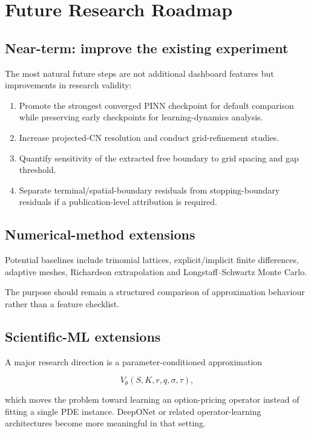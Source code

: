 \documentclass[11pt,a4paper]{article}
\begin{document}
\section{Future Research Roadmap}

\subsection{Near-term: improve the existing experiment}

The most natural future steps are not additional dashboard features but improvements in research validity:

\begin{enumerate}[leftmargin=2em]
\item Promote the strongest converged PINN checkpoint for default comparison while preserving early checkpoints for learning-dynamics analysis.
\item Increase projected-CN resolution and conduct grid-refinement studies.
\item Quantify sensitivity of the extracted free boundary to grid spacing and gap threshold.
\item Separate terminal/spatial-boundary residuals from stopping-boundary residuals if a publication-level attribution is required.
\end{enumerate}

\subsection{Numerical-method extensions}

Potential baselines include trinomial lattices, explicit/implicit finite differences, adaptive meshes, Richardson extrapolation and Longstaff--Schwartz Monte Carlo.

The purpose should remain a structured comparison of approximation behaviour rather than a feature checklist.

\subsection{Scientific-ML extensions}

A major research direction is a parameter-conditioned approximation

\[
V_\theta(S,K,r,q,\sigma,\tau),
\]

which moves the problem toward learning an option-pricing operator instead of fitting a single PDE instance. DeepONet or related operator-learning architectures become more meaningful in that setting.
\end{document}
